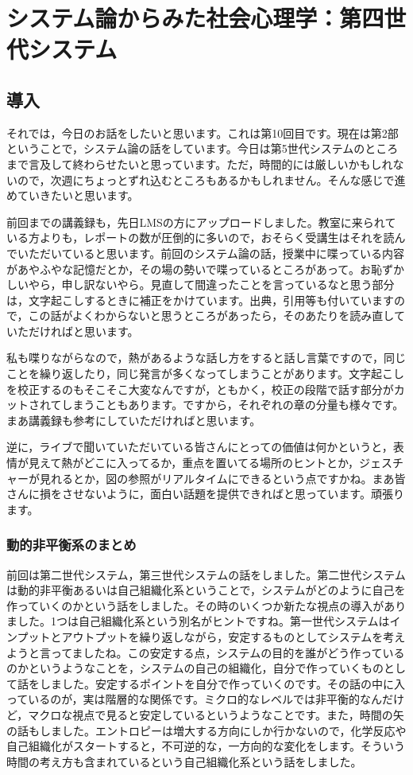 \documentclass{ltjsbook}
\begin{document}
\setcounter{chapter}{9}
\chapter{システム論からみた社会心理学：第四世代システム}
\label{sp10_system}

\section{導入}

それでは，今日のお話をしたいと思います。これは第10回目です。現在は第2部ということで，システム論の話をしています。今日は第5世代システムのところまで言及して終わらせたいと思っています。ただ，時間的には厳しいかもしれないので，次週にちょっとずれ込むところもあるかもしれません。そんな感じで進めていきたいと思います。

前回までの講義録も，先日LMSの方にアップロードしました。教室に来られている方よりも，レポートの数が圧倒的に多いので，おそらく受講生はそれを読んでいただいていると思います。前回のシステム論の話，授業中に喋っている内容があやふやな記憶だとか，その場の勢いで喋っているところがあって。お恥ずかしいやら，申し訳ないやら。見直して間違ったことを言っているなと思う部分は，文字起こしするときに補正をかけています。出典，引用等も付いていますので，この話がよくわからないと思うところがあったら，そのあたりを読み直していただければと思います。

私も喋りながらなので，熱があるような話し方をすると話し言葉ですので，同じことを繰り返したり，同じ発言が多くなってしまうことがあります。文字起こしを校正するのもそこそこ大変なんですが，ともかく，校正の段階で話す部分がカットされてしまうこともあります。ですから，それぞれの章の分量も様々です。まあ講義録も参考にしていただければと思います。

逆に，ライブで聞いていただいている皆さんにとっての価値は何かというと，表情が見えて熱がどこに入ってるか，重点を置いてる場所のヒントとか，ジェスチャーが見れるとか，図の参照がリアルタイムにできるという点ですかね。まあ皆さんに損をさせないように，面白い話題を提供できればと思っています。頑張ります。

\subsection{動的非平衡系のまとめ}

前回は第二世代システム，第三世代システムの話をしました。第二世代システムは動的非平衡あるいは自己組織化系ということで，システムがどのように自己を作っていくのかという話をしました。その時のいくつか新たな視点の導入がありました。1つは自己組織化系という別名がヒントですね。第一世代システムはインプットとアウトプットを繰り返しながら，安定するものとしてシステムを考えようと言ってましたね。この安定する点，システムの目的を誰がどう作っているのかというようなことを，システムの自己の組織化，自分で作っていくものとして話をしました。安定するポイントを自分で作っていくのです。その話の中に入っているのが，実は階層的な関係です。ミクロ的なレベルでは非平衡的なんだけど，マクロな視点で見ると安定しているというようなことです。また，時間の矢の話もしました。エントロピーは増大する方向にしか行かないので，化学反応や自己組織化がスタートすると，不可逆的な，一方向的な変化をします。そういう時間の考え方も含まれているという自己組織化系という話をしました。
\end{document}
